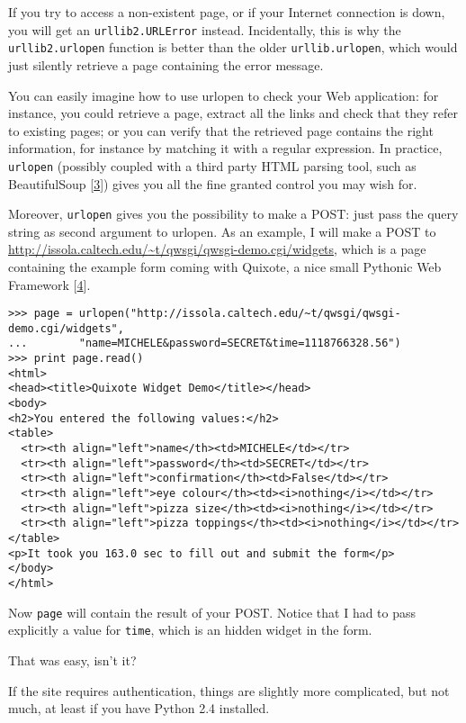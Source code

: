 \documentclass[10pt,a4paper,english]{article}
\begin{document}
If you try to access a non-existent page, or if your Internet
connection is down, you will get an \texttt{urllib2.URLError} instead. 
Incidentally, this is why the \texttt{urllib2.urlopen} function is better 
than the older \texttt{urllib.urlopen}, which would just silently retrieve 
a page containing the error message.

You can easily imagine how to use urlopen to check your Web application:
for instance, you could retrieve a page, extract all the links and
check that they refer to existing pages; or you can verify that
the retrieved page contains the right information, for instance
by matching it with a regular expression. In practice, \texttt{urlopen}
(possibly coupled with a third party HTML parsing tool, such as
BeautifulSoup [\hyperlink{id13}{3}]) gives you all the fine granted control you may wish for.

Moreover, \texttt{urlopen} gives you the possibility to make a POST: 
just pass the query
string as second argument to urlopen. As an example, I will make a POST
to \href{http://issola.caltech.edu/~t/qwsgi/qwsgi-demo.cgi/widgets}{http://issola.caltech.edu/{\textasciitilde}t/qwsgi/qwsgi-demo.cgi/widgets}, which is a
page containing the example form coming with Quixote, a nice small
Pythonic Web Framework [\hyperlink{id14}{4}].
\begin{verbatim}>>> page = urlopen("http://issola.caltech.edu/~t/qwsgi/qwsgi-demo.cgi/widgets",
...        "name=MICHELE&password=SECRET&time=1118766328.56")
>>> print page.read()
<html>
<head><title>Quixote Widget Demo</title></head>
<body>
<h2>You entered the following values:</h2>
<table>
  <tr><th align="left">name</th><td>MICHELE</td></tr>
  <tr><th align="left">password</th><td>SECRET</td></tr>
  <tr><th align="left">confirmation</th><td>False</td></tr>
  <tr><th align="left">eye colour</th><td><i>nothing</i></td></tr>
  <tr><th align="left">pizza size</th><td><i>nothing</i></td></tr>
  <tr><th align="left">pizza toppings</th><td><i>nothing</i></td></tr>
</table>
<p>It took you 163.0 sec to fill out and submit the form</p>
</body>
</html>\end{verbatim}

Now \texttt{page} will contain the result of your POST. Notice that I had to
pass explicitly a value for \texttt{time}, which is an hidden widget in
the form.

That was easy, isn't it?

If the site requires authentication, things are slightly more complicated,
but not much, at least if you have Python 2.4 installed.
\end{document}
